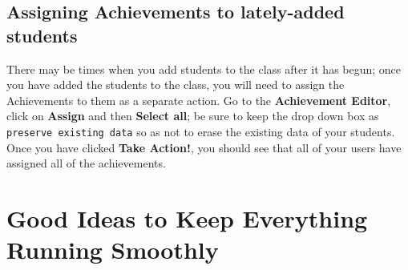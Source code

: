 \documentclass[12pt]{article}
\newcommand{\menu}[1]{\textbf{#1}}
\begin{document}
\subsection{Assigning Achievements to lately-added students}\label{achievementslateaddstudents}
There may be times when you add students to the class after it has begun; once you have added the students to the class, you will need to assign the Achievements to them as a separate action. Go to the \menu{Achievement Editor}, click on \menu{Assign} and then \menu{Select all}; be sure to keep the drop down box as \texttt{preserve existing data} so as not to erase the existing data of your students. Once you have clicked \menu{Take Action!}, you should see that all of your users have assigned all of the achievements.


\section{Good Ideas to Keep Everything Running Smoothly}\label{goodideas}
\end{document}
